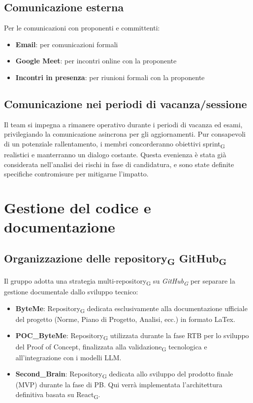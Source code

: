 \documentclass[11pt,a4paper]{article}
\newcommand{\gls}[1]{#1\textsubscript{G}}
\begin{document}
\subsection{Comunicazione esterna}
Per le comunicazioni con proponenti e committenti:
\begin{itemize}
    \item \textbf{Email}: per comunicazioni formali
    \item \textbf{Google Meet}: per incontri online con la proponente
    \item \textbf{Incontri in presenza}: per riunioni formali con la proponente
\end{itemize}

\subsection{Comunicazione nei periodi di vacanza/sessione}
Il team si impegna a rimanere operativo durante i periodi di vacanza ed esami, privilegiando la comunicazione asincrona per gli aggiornamenti. Pur consapevoli di un potenziale rallentamento, i membri concorderanno obiettivi \gls{sprint} realistici e manterranno un dialogo costante. Questa evenienza è stata già considerata nell'analisi dei rischi in fase di candidatura, e sono state definite specifiche contromisure per mitigarne l'impatto.

\newpage

\section{Gestione del codice e documentazione}

\subsection{Organizzazione delle \gls{repository} \gls{GitHub}}
Il gruppo adotta una strategia multi-\gls{repository} su \textit{\gls{GitHub}} per separare la gestione documentale dallo sviluppo tecnico:
\begin{itemize}
    \item \textbf{ByteMe}: \gls{Repository} dedicata esclusivamente alla documentazione ufficiale del progetto (Norme, Piano di Progetto, Analisi, ecc.) in formato LaTex.
    \item \textbf{POC\_ByteMe}: \gls{Repository} utilizzata durante la fase RTB per lo sviluppo del Proof of Concept, finalizzata alla \gls{validazione} tecnologica e all'integrazione con i modelli LLM.
    \item \textbf{Second\_Brain}: \gls{Repository} dedicata allo sviluppo del prodotto finale (MVP) durante la fase di PB. Qui verrà implementata l'architettura definitiva basata su \gls{React}.
\end{itemize}
\end{document}
